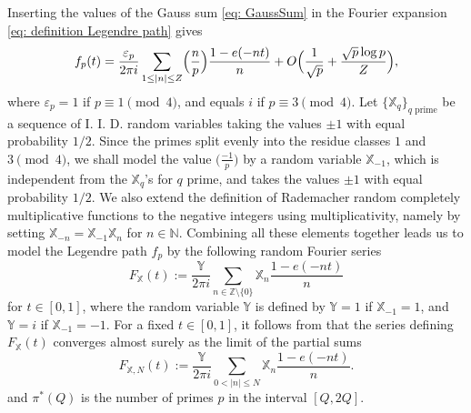 \documentclass[10pt]{amsart}
\theoremstyle{plain}
\theoremstyle{definition}
\newcommand{\Legendre}[2]{\Bigl(\dfrac{#1}{#2}\Bigr)}
\newcommand{\X}{\mathbb{X}}
\newcommand{\Y}{\mathbb{Y}}
\begin{document}
Inserting the values of the Gauss sum \eqref{eq: GaussSum} in the Fourier expansion \eqref{eq: definition Legendre path} gives
\begin{equation}\label{eq: PolyaFourier}
f_p(t) = \frac{\varepsilon_p}{2 \pi i } \sum_{1 \leq |n| \leq Z} \Legendre{n}{p} \frac{1 - e(-nt)}{n} + O \Bigl(\frac{1}{\sqrt{p}}+\frac{\sqrt{p}\log p}{Z} \Bigr),
\end{equation}
where $\varepsilon_p= 1$ if $p\equiv 1\pmod 4$, and equals $i$ if $p\equiv 3\pmod 4$. Let $\{\X_q\}_{q \text{ prime}}$ be a sequence of I. I. D. random variables taking the values $\pm 1$ with equal probability $1/2$. Since the primes split evenly into the residue classes $1$ and $3 \pmod 4$, we shall model the value $\bigl(\frac{-1}{p}\bigr)$ by a random variable $\X_{-1}$, which is independent from the $\X_q$'s for $q$ prime, and takes the values $\pm1$ with equal probability $1/2$. We also extend the definition of Rademacher random completely multiplicative functions to the negative integers using multiplicativity, namely by setting $\X_{-n}=\X_{-1}\X_n$ for $n\in \mathbb{N}$. Combining all these elements together leads us to model the Legendre path $f_p$ by the following random Fourier series\vspace*{-3pt}
\[
F_{\X}(t):= \frac{\Y}{2 \pi i} \sum_{n \in \mathbb{Z}\setminus\{0\}} \X_n \frac{1 - e(-nt)}{n} \]
for $t\in [0,1]$, where the random variable $\Y$ is defined by $\Y= 1$ if $\X_{-1}=1$, and $\Y=i$ if $\X_{-1}=-1$. For a fixed $t\in [0, 1]$, it follows from \cite[Lem.\,1]{Ka} that the series defining $F_{\X}(t)$ converges almost surely as the limit of the partial sums\vspace*{-3pt}
\[F_{\X, N}(t):=\frac{\Y}{2 \pi i} \sum_{0<|n|\leq N} \X_n \frac{1 - e(-nt)}{n}. \]
and $\pi^*(Q)$ is the number of primes $p$ in the interval $[Q, 2Q]$.
\end{document}
